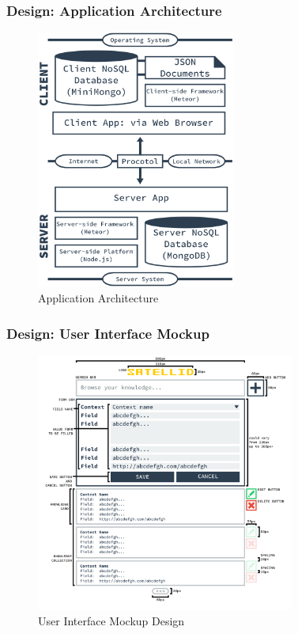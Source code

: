 \documentclass[10pt, compress]{beamer}
\begin{document}
\begin{frame}[fragile]
  \frametitle{Design: Application Architecture}

  \begin{figure}[ht]
    \centering
    \vspace{-25pt}
    \includegraphics[height=8.5cm]{include/satellid-app-arch.png}
    \vspace{-10pt}
    \caption{Application Architecture}
    \label{fig:satellid-app-arch}
  \end{figure}

\end{frame}


\begin{frame}[fragile]
  \frametitle{Design: User Interface Mockup}

  \begin{figure}[ht]
    \centering
    \vspace{-25pt}
    \includegraphics[height=8.5cm]{include/satellid-app-ui.png}
    \vspace{-10pt}
    \caption{User Interface Mockup Design}
    \label{fig:satellid-app-ui}
  \end{figure}

\end{frame}
\end{document}
